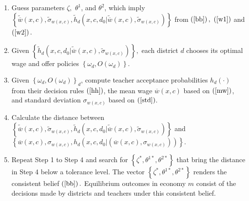 \documentclass[notitlepage,12pt]{article}%
\begin{document}
\begin{enumerate}
\item Guess parameters $\zeta,$ $\theta^{1}$, and $\theta^{2}$, which imply
$\left\{  \widetilde{\overline{w}}\left(  x,c\right)  ,\widetilde{\sigma
}_{w\left(  x,c\right)  },\widetilde{h}_{d}\left(  x,c,d_{0}%
|\widetilde{\overline{w}}\left(  x,c\right)  ,\widetilde{\sigma}_{w\left(
x,c\right)  }\right)  \right\}  $ from $\left(  \ref{bb}\right)  ,$ $\left(
\ref{w1}\right)  $ and $\left(  \ref{w2}\right)  .$

\item Given $\left\{  \widetilde{h}_{d}\left(  x,c,d_{0}|\widetilde{\overline
{w}}\left(  x,c\right)  ,\widetilde{\sigma}_{w\left(  x,c\right)  }\right)
\right\}  ,$ each district $d$ chooses its optimal wage and offer policies
$\left\{  \omega_{d},O\left(  \omega_{d}\right)  \right\}  .$

\item Given $\left\{  \omega_{d},O\left(  \omega_{d}\right)  \right\}  _{d}$,
compute teacher acceptance probabilities $h_{d}\left(  \cdot\right)  $ from
their decision rules $\left(  \ref{hh}\right)  $, the mean wage $\overline
{w}\left(  x,c\right)  $ based on $\left(  \ref{mw}\right)  $, and standard
deviation $\sigma_{w\left(  x,c\right)  }$ based on $\left(  \ref{std}\right)
$.

\item Calculate the distance between $\left\{  \widetilde{\overline{w}}\left(
x,c\right)  ,\widetilde{\sigma}_{w\left(  x,c\right)  },\widetilde{h}%
_{d}\left(  x,c,d_{0}|\widetilde{\overline{w}}\left(  x,c\right)
,\widetilde{\sigma}_{w\left(  x,c\right)  }\right)  \right\}  $ and
\newline$\left\{  \overline{w}\left(  x,c\right)  ,\sigma_{w\left(
x,c\right)  },h_{d}\left(  x,c,d_{0}|\left(  \overline{w}\left(  x,c\right)
,\sigma_{w\left(  x,c\right)  }\right)  \right)  \right\}  .$

\item Repeat Step 1 to Step 4 and search for $\left\{  \zeta^{\ast}%
,\theta^{1\ast},\theta^{2\ast}\right\}  $ that bring the distance in Step 4
below a tolerance level. The vector $\left\{  \zeta^{\ast},\theta^{1\ast
},\theta^{2\ast}\right\}  $ renders the consistent belief $\left(
\ref{bb}\right)  .$ Equilibrium outcomes in economy $m$ consist of the
decisions made by districts and teachers under this consistent belief.
\end{enumerate}

\end{document}
